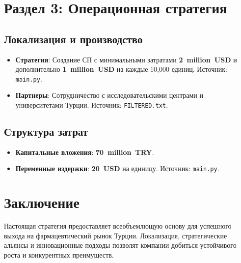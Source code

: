 \documentclass[a4paper,12pt]{article}
\begin{document}
\section{Раздел 3: Операционная стратегия}

\subsection{Локализация и производство}
\begin{itemize}
    \item \textbf{Стратегия}: Создание СП с минимальными затратами \textbf{2~million~USD} и дополнительно \textbf{1~million~USD} на каждые 10,000 единиц. Источник: \texttt{main.py}.
    \item \textbf{Партнеры}: Сотрудничество с исследовательскими центрами и университетами Турции. Источник: \texttt{FILTERED.txt}.
\end{itemize}

\subsection{Структура затрат}
\begin{itemize}
    \item \textbf{Капитальные вложения}: \textbf{70~million~TRY}.
    \item \textbf{Переменные издержки}: \textbf{20~USD} на единицу. Источник: \texttt{main.py}.
\end{itemize}

\section{Заключение}
Настоящая стратегия предоставляет всеобъемлющую основу для успешного выхода на фармацевтический рынок Турции. Локализация, стратегические альянсы и инновационные подходы позволят компании добиться устойчивого роста и конкурентных преимуществ.
\end{document}
